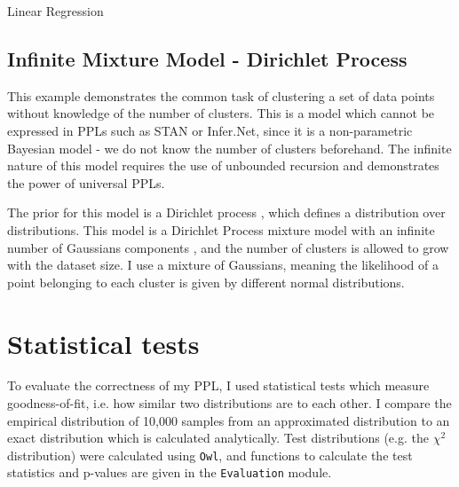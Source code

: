 \begin{listing}[!ht]
	\caption{Linear Regression}
	\label{lst:linreg}
\end{listing}

\subsection{Infinite Mixture Model - Dirichlet Process}
This example demonstrates the common task of clustering a set of data points without knowledge of the number of clusters. This is a model which cannot be expressed in PPLs such as STAN or Infer.Net, since it is a non-parametric Bayesian model - we do not know the number of clusters beforehand. The infinite nature of this model requires the use of unbounded recursion and demonstrates the power of universal PPLs.

The prior for this model is a Dirichlet process \cite{teh2010dirichlet}, which defines a distribution over distributions. This model is a Dirichlet Process mixture model with an infinite number of Gaussians components \cite{dpmm}, and the number of clusters is allowed to grow with the dataset size. I use a mixture of Gaussians, meaning the likelihood of a point belonging to each cluster is given by different normal distributions.

\begin{listing}[H]
\end{listing}




\section{Statistical tests}
To evaluate the correctness of my PPL, I used statistical tests which measure goodness-of-fit, i.e. how similar two distributions are to each other. I compare the empirical distribution of 10,000 samples from an approximated distribution to an exact distribution which is calculated analytically. Test distributions (e.g. the $\chi^2$ distribution) were calculated using \texttt{Owl}, and functions to calculate the test statistics and p-values are given in the \texttt{Evaluation} module.

